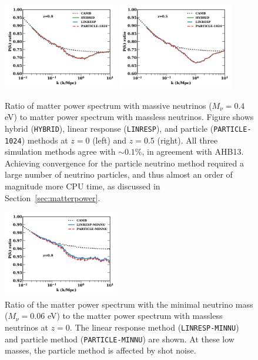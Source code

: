 \documentclass[useAMS, usenatbib]{mnras}
\begin{document}
\begin{figure}
\includegraphics[width=0.45\textwidth]{nuplots/pks_rel-10.pdf}
\includegraphics[width=0.45\textwidth]{nuplots/pks_rel-0_66670.pdf}
  \caption{Ratio of matter power spectrum with massive neutrinos ($M_\nu = 0.4$ eV) to matter power spectrum with massless neutrinos. Figure shows hybrid (\texttt{HYBRID}), linear response (\texttt{LINRESP}), and particle (\texttt{PARTICLE-1024}) methods at $z=0$ (left) and $z=0.5$ (right). All three simulation methods agree with $\sim 0.1$\%, in agreement with AHB13. Achieving convergence for the particle neutrino method required a large number of neutrino particles, and thus almost an order of magnitude more CPU time, as discussed in Section~\ref{sec:matterpower}.}
  \label{fig:matter_power}
\end{figure}

\begin{figure}
\includegraphics[width=0.45\textwidth]{nuplots/pks_lowmass-10.pdf}
\caption{Ratio of the matter power spectrum with the minimal neutrino mass ($M_\nu = 0.06$ eV) to the matter power spectrum with massless neutrinos at $z=0$. The linear response method (\texttt{LINRESP-MINNU}) and particle method (\texttt{PARTICLE-MINNU}) are shown. At these low masses, the particle method is affected by shot noise. }
\label{fig:minimal_mass}
\end{figure}
\end{document}
